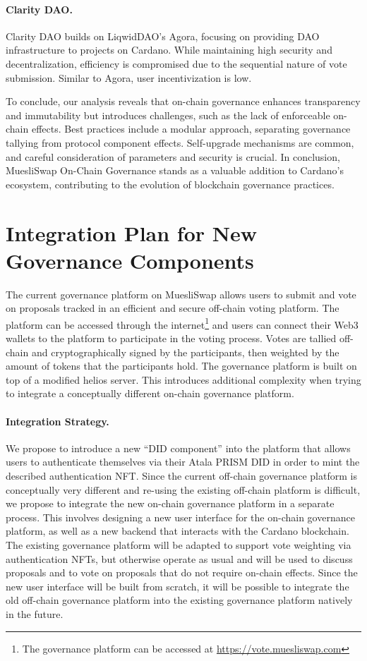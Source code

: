 \documentclass[11pt]{article}
\begin{document}
\paragraph{Clarity DAO.} Clarity DAO builds on LiqwidDAO's Agora, focusing on providing DAO infrastructure to projects on Cardano. While maintaining high security and decentralization, efficiency is compromised due to the sequential nature of vote submission. Similar to Agora, user incentivization is low.

To conclude, our analysis reveals that on-chain governance enhances transparency and immutability but introduces challenges, such as the lack of enforceable on-chain effects. Best practices include a modular approach, separating governance tallying from protocol component effects. Self-upgrade mechanisms are common, and careful consideration of parameters and security is crucial. In conclusion, MuesliSwap On-Chain Governance stands as a valuable addition to Cardano's ecosystem, contributing to the evolution of blockchain governance practices.



\section{Integration Plan for New Governance Components}

The current governance platform on MuesliSwap allows users to submit and vote on proposals tracked in an efficient and secure off-chain voting platform.
The platform can be accessed through the internet\footnote{The governance platform can be accessed at \url{https://vote.muesliswap.com}} and users can connect
their Web3 wallets to the platform to participate in the voting process.
Votes are tallied off-chain and cryptographically signed by the participants, then weighted by the amount of tokens that the participants hold. The governance platform is built on top of a modified helios server.
This introduces additional complexity when trying to integrate a conceptually different on-chain governance platform.

\paragraph{Integration Strategy.} We propose to introduce a new ``DID component'' into the platform that allows users to authenticate themselves via their Atala PRISM DID in order to mint the described authentication NFT.
Since the current off-chain governance platform is conceptually very different and re-using the existing off-chain platform is difficult,
we propose to integrate the new on-chain governance platform in a separate process.
This involves designing a new user interface for the on-chain governance platform, as well as a new backend that interacts with the Cardano blockchain.
The existing governance platform will be adapted to support vote weighting via authentication NFTs, but otherwise operate as usual and will be used to discuss proposals and to vote on proposals that do not require on-chain effects.
Since the new user interface will be built from scratch, it will be possible to integrate the old off-chain governance platform into the existing governance platform natively in the future.
\end{document}
